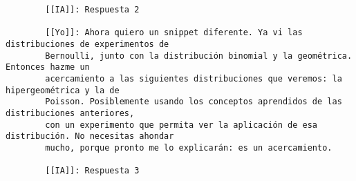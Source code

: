 \documentclass[letterpaper, 12pt]{article}
\begin{document}
\begin{verbatim}
		[[IA]]: Respuesta 2
		
		[[Yo]]: Ahora quiero un snippet diferente. Ya vi las distribuciones de experimentos de
		Bernoulli, junto con la distribución binomial y la geométrica. Entonces hazme un
		acercamiento a las siguientes distribuciones que veremos: la hipergeométrica y la de
		Poisson. Posiblemente usando los conceptos aprendidos de las distribuciones anteriores,
		con un experimento que permita ver la aplicación de esa distribución. No necesitas ahondar
		mucho, porque pronto me lo explicarán: es un acercamiento.
		
		[[IA]]: Respuesta 3
	\end{verbatim}
\end{document}
